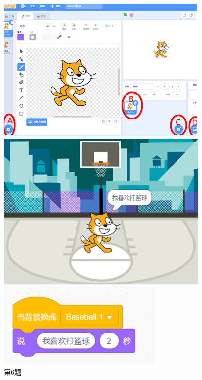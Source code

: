 \documentclass[10.5pt, a4paper]{article}
\begin{document}
\begin{enumerate}
\begin{figure}[htbp]
\begin{minipage}[t]{.2\textwidth}
                \includegraphics[width=\textwidth]{6.png}
                \caption*{第6题}
            \end{minipage}
            \begin{minipage}[t]{.38\textwidth}
                \centering
                \begin{minipage}[t]{.5\textwidth}
                    \centering
                    \includegraphics[width=\textwidth]{8-1.png}
                \end{minipage}
                \begin{minipage}[t]{.48\textwidth}
                    \centering
                    \includegraphics[width=\textwidth]{8-2.png}

\end{minipage}
\end{minipage}
\end{figure}
\end{enumerate}
\end{document}
